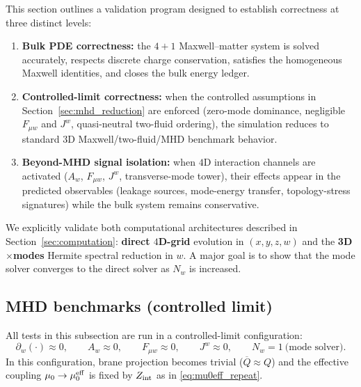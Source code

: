 \documentclass[11pt]{article}
\newcommand{\Proj}[1]{\overline{#1}} %
\newcommand{\Zint}{Z_{\rm int}}
\begin{document}
This section outlines a validation program designed to establish correctness at
three distinct levels:
\begin{enumerate}[leftmargin=1.6em]
\item \textbf{Bulk PDE correctness:} the \(4+1\) Maxwell--matter system is solved
accurately, respects discrete charge conservation, satisfies the homogeneous Maxwell
identities, and closes the bulk energy ledger.
\item \textbf{Controlled-limit correctness:} when the controlled assumptions in
Section~\ref{sec:mhd_reduction} are enforced (zero-mode dominance, negligible
\(F_{\mu w}\) and \(J^w\), quasi-neutral two-fluid ordering), the simulation reduces
to standard \(3\)D Maxwell/two-fluid/MHD benchmark behavior.
\item \textbf{Beyond-MHD signal isolation:} when \(4\)D interaction channels are
activated (\(A_w\), \(F_{\mu w}\), \(J^w\), transverse-mode tower), their effects appear
in the predicted observables (leakage sources, mode-energy transfer, topology-stress
signatures) while the bulk system remains conservative.
\end{enumerate}

We explicitly validate both computational architectures described in
Section~\ref{sec:computation}:
\textbf{direct \(4\)D-grid} evolution in \((x,y,z,w)\) and the \textbf{3D\(\times\)modes}
Hermite spectral reduction in \(w\). A major goal is to show that the mode solver
converges to the direct solver as \(N_w\) is increased.

\subsection{MHD benchmarks (controlled limit)}
\label{sec:validation_mhd}

All tests in this subsection are run in a controlled-limit configuration:
\begin{equation}
\partial_w(\cdot)\approx 0,\qquad A_w\approx 0,\qquad F_{\mu w}\approx 0,\qquad J^w\approx 0,
\qquad N_w=1 \ \text{(mode solver)}.
\label{eq:controlled_validation_config}
\end{equation}
In this configuration, brane projection becomes trivial (\(\Proj{Q}\approx Q\)) and the
effective coupling \(\mu_0\to\mu_0^{\rm eff}\) is fixed by \(\Zint\) as in
\eqref{eq:mu0eff_repeat}.
\end{document}
